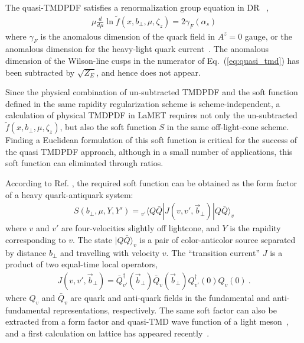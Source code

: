 \documentclass[twocolumn,aps,prd,preprintnumbers,superscriptaddress,10pt]{revtex4-1}
\begin{document}
The quasi-TMDPDF satisfies a renormalization group equation in DR ~\cite{Collins:1981uk,Ji:2004wu},
\begin{align}\label{eq:quasiRGE}
\mu\frac{d}{d\mu}\ln {\tilde f}(x,b_\perp,\mu,\zeta_z) = 2\gamma_F(\alpha_s)
\end{align}
where $\gamma_F$ is the anomalous dimension of the quark field in $A^z=0$ gauge, or the anomalous dimension for the heavy-light quark current~\cite{Falk:1990yz,Ji:1991pr,Braun:2020ymy}. The anomalous dimension of
the Wilson-line cusps in the numerator of Eq.~(\ref{eq:quasi_tmd}) has been subtracted by $\sqrt{Z_E}$,
and hence does not appear.



Since the physical combination of un-subtracted TMDPDF and the soft function defined in the same rapidity
regularization scheme is scheme-independent, a calculation of physical
TMDPDF in LaMET requires not only the un-subtracted
$\tilde f(x,b_\perp,\mu,\zeta_z)$, but also the soft function $S$ in the same off-light-cone scheme.
Finding a Euclidean formulation of this soft function is critical
for the success of the quasi TMDPDF approach, although in a small number of
applications, this soft function can eliminated through ratios.

According to Ref. \cite{Ji:2019sxk}, the required soft function can be obtained as the form factor of a heavy quark-antiquark system:
\begin{align} \label{eq:soft_HQET}
S(b_\perp,\mu,Y,Y') = {}_{v'}\langle Q\bar Q|J(v,v',\vec b_\perp)|Q\bar Q\rangle_v
\end{align}
where $v$ and $v'$ are four-velocities slightly off lightcone, and $Y$ is the rapidity corresponding to $v$.
The state $|Q\bar Q\rangle_v$ is a pair of color-anticolor source separated by distance $b_\perp$
and travelling with velocity $v$.
The ``transition current'' $J$ is a product of two equal-time local operators,
\begin{align}
J(v,v',\vec{b}_\perp)= \bar Q^\dagger_{v'}(\vec{b}_\perp)\bar Q_v(\vec{b}_\perp)Q_{v'}^\dagger(0)Q_v(0) \ .
\end{align}
where $Q_v$ and $\bar Q_v$ are quark and anti-quark fields in the fundamental and anti-fundamental representations, respectively. The same soft factor can also be extracted from a form factor and quasi-TMD wave function
of a light meson~\cite{Ji:2019sxk}, and a first calculation on lattice has appeared recently~\cite{Zhang:2020dbb}.
\end{document}
